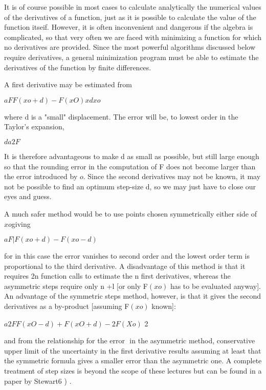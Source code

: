      It is of course possible in most cases to calculate analytically the
numerical values of the derivatives of a function, just as it is possible
to calculate the value of the function itseif.  However, it is often
inconvenient and dangerous if the algebra is complicated, so that very
often we are faced with minimizing a function for which no derivatives
are provided. Since the most powerful algorithms discussed below require
derivatives, a general minimization program must be able to estimate the
derivatives of the function by finite differences.
 
     A first derivative may be estimated from
 
 
                      $aF      F(xo+ d) - F(xO)
                        x              d
 
                       x o$
 
 
where d is a "small" displacement.  The error will be, to lowest order
in the Taylor's expansion,
 
                                $d   a2F$
 
 It is therefore advantageous to make d as small as possible, but still
large enough so that the rounding error in the computation of F does not
become larger than the error introduced by $o.$ Since the second derivatives may not be known, it may not be possible to find an optimum
step-size d, so we may just have to close our eyes and guess.
 
     A much safer method would be to use points chosen symmetrically
either side of $xo$giving
 
 
                      $aF|     F(xo + d) - F(xo - d)$
 
 
for in this case the error  vanishes to second order and the lowest
order term is proportional to the third derivative. A disadvantage of
this method is that it requires 2n function calls to estimate the n first
derivatives, whereas the asymmetric steps require only n +l [or only
F$(xo)$ has to be evaluated anyway].  An advantage of the symmetric steps
method, however, is that it gives the second derivatives as a
by-product [assuming F$(xo)$ known]:
 
 
                 $a2F   F(xO - d) + F(xO+ d) - 2F(Xo)$
                                      2
 
 
and from the relationship for the error $$ in the asymmetric method,
conservative upper limit of the uncertainty in the first derivative
results assuming at least that the symmetric formula gives a smaller
error than the asymmetric one.  A complete treatment of step sizes is
beyond the scope of these lectures but can be found in a paper by
Stewart6 ) .
 
